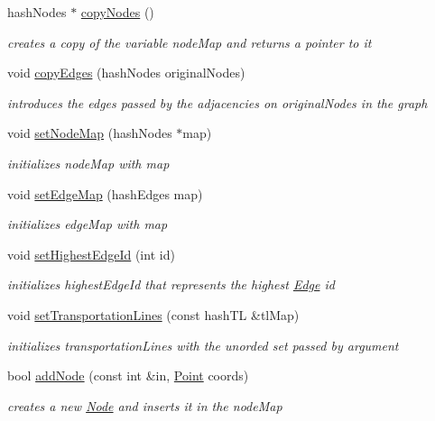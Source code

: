 \begin{DoxyCompactItemize}
hash\+Nodes $\ast$ \hyperlink{class_graph_a02b0af25356896f49a3941e8f1bac3b8}{copy\+Nodes} ()
\begin{DoxyCompactList}\small\item\em creates a copy of the variable node\+Map and returns a pointer to it \end{DoxyCompactList}\item 
void \hyperlink{class_graph_a297bab836a9397ef5732b3924deeafb4}{copy\+Edges} (hash\+Nodes original\+Nodes)
\begin{DoxyCompactList}\small\item\em introduces the edges passed by the adjacencies on original\+Nodes in the graph \end{DoxyCompactList}\item 
void \hyperlink{class_graph_a342c1bc740c82046683166667588899d}{set\+Node\+Map} (hash\+Nodes $\ast$map)
\begin{DoxyCompactList}\small\item\em initializes node\+Map with map \end{DoxyCompactList}\item 
void \hyperlink{class_graph_abce5f69b8757a18b52f17505b2b87b0e}{set\+Edge\+Map} (hash\+Edges map)
\begin{DoxyCompactList}\small\item\em initializes edge\+Map with map \end{DoxyCompactList}\item 
void \hyperlink{class_graph_ab52ab0dd69a65e534ef447af5efadb7e}{set\+Highest\+Edge\+Id} (int id)
\begin{DoxyCompactList}\small\item\em initializes highest\+Edge\+Id that represents the highest \hyperlink{class_edge}{Edge} id \end{DoxyCompactList}\item 
void \hyperlink{class_graph_abfb876ce751334f9d07ee4b8b6bd5370}{set\+Transportation\+Lines} (const hash\+TL \&tl\+Map)
\begin{DoxyCompactList}\small\item\em initializes transportation\+Lines with the unorded set passed by argument \end{DoxyCompactList}\item 
bool \hyperlink{class_graph_abcc536231b6a29829e207e2177fb9f2e}{add\+Node} (const int \&in, \hyperlink{struct_point}{Point} coords)
\begin{DoxyCompactList}\small\item\em creates a new \hyperlink{class_node}{Node} and inserts it in the node\+Map \end{DoxyCompactList}\item 

\end{DoxyCompactItemize}
